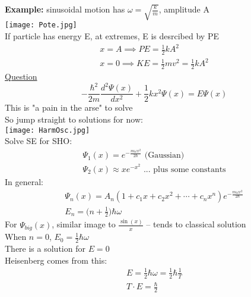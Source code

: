 \documentclass[a4paper, 11pt, fleqn, normalem]{report}
\begin{document}
\textbf{Example: }sinusoidal motion has $\omega = \sqrt{\frac{k}{m}}$, amplitude A \\
\texttt{[image: Pote.jpg]} \\
If particle has energy E, at extremes, E is desrcibed by PE
\begin{gather*}
    x = A \implies PE = \frac{1}{2}kA^{2} \\
    x = 0 \implies KE = \frac{1}{2}mv^{2} = \frac{1}{2}kA^{2}
\end{gather*}
\underline{Question}
\begin{equation*}
    -\frac{\hbar^{2}}{2m}\frac{d^{2}\Psi(x)}{dx^{2}} + \frac{1}{2}kx^{2}\Psi(x) = E\Psi(x)
\end{equation*}
This is "a pain in the arse" to solve \\
So jump straight to solutions for now: \\
\texttt{[image: HarmOsc.jpg]} \\
Solve SE for SHO:
\begin{gather*}
    \Psi_{1}(x) = e^{-\tfrac{m\omega x^{2}}{2\hbar}}\text{ (Gaussian)} \\
    \Psi_{2}(x) \approx xe^{-x^{2}}\text{ ... plus some constants}
\end{gather*}
In general:
\begin{gather*}
    \Psi_{n}(x) = A_{n}(1 + c_{1}x + c_{2}x^{2} + \cdots + c_{n}x^{n})e^{-\tfrac{m\omega x^{2}}{2\hbar}} \\
    E_{n} = \bigg(n + \frac{1}{2}\bigg)\hbar\omega
\end{gather*}
For $\Psi_{big}(x)$, similar image to $\frac{\sin(x)}{x}$ -- tends to classical solution \\
When $n = 0$, $E_{0} = \frac{1}{2}\hbar\omega$ \\
There is a solution for $E = 0$ \\
Heisenberg comes from this:
\begin{gather*}
    E = \frac{1}{2}\hbar\omega = \frac{1}{2}\hbar\frac{1}{T} \\
    T\cdot E = \frac{\hbar}{2}
\end{gather*}
\end{document}
